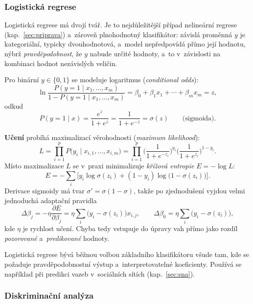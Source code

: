 \documentclass[11pt,a4paper]{article}
\theoremstyle{definition}
\begin{document}
\subsubsection{Logistická regrese}
\label{ssec:logreg}

Logistická regrese má dvojí tvář. Je to nejdůležitější případ nelineární regrese
(kap.~\ref{sec:priprava}) a~zároveň plnohodnotný klasifikátor: závislá proměnná $y$ je
kategoriální, typicky dvouhodnotová, a~model nepředpovídá přímo její hodnotu, nýbrž
\emph{pravděpodobnost}, že $y$ nabude určité hodnoty, a~to v~závislosti na kombinaci hodnot
nezávislých veličin.

\begin{defbox}
Pro binární $y\in\{0,1\}$ se modeluje logaritmus 
(\emph{conditional odds}):
\[ \ln\frac{P(y=1\mid x_1,\dots,x_m)}{1-P(y=1\mid x_1,\dots,x_m)}
   =\beta_0+\beta_1x_1+\cdots+\beta_mx_m=z, \]
odkud
\[ P(y=1\mid x)=\frac{e^{z}}{1+e^{z}}=\frac{1}{1+e^{-z}}=\sigma(z)
   \qquad\text{(sigmoida).} \]

\textbf{Učení} probíhá maximalizací věrohodnosti (\emph{maximum likelihood}):
\[ L=\prod_{i=1}^{p}P\big(y_i\mid x_{i,1},\dots,x_{i,m}\big)
   =\prod_{i=1}^{p}\Big(\frac{1}{1+e^{-z_i}}\Big)^{y_i}
     \Big(\frac{1}{1+e^{z_i}}\Big)^{1-y_i}. \]
Místo maximalizace $L$ se v~praxi minimalizuje \emph{křížová entropie} $E=-\log L$:
\[ E=-\sum_i\Big[y_i\log\sigma(z_i)+(1-y_i)\log\big(1-\sigma(z_i)\big)\Big]. \]
Derivace sigmoidy má tvar $\sigma'=\sigma(1-\sigma)$, takže po zjednodušení vyjdou velmi
jednoduchá adaptační pravidla
\[ \Delta\beta_j=-\eta\frac{\partial E}{\partial\beta_j}
   =\eta\sum_i\big(y_i-\sigma(z_i)\big)x_{i,j},\qquad
   \Delta\beta_0=\eta\sum_i\big(y_i-\sigma(z_i)\big), \]
kde $\eta$ je rychlost učení. Chyba tedy vstupuje do úpravy vah přímo jako rozdíl
\emph{pozorované} a~\emph{predikované} hodnoty.
\end{defbox}

Logistická regrese bývá běžnou volbou základního klasifikátoru všude tam, kde se požaduje
pravděpodobnostní výstup a~interpretovatelné koeficienty. Používá se například při predikci
vazeb v~sociálních sítích (kap.~\ref{sec:sna}).

\subsubsection{Diskriminační analýza}
\end{document}
